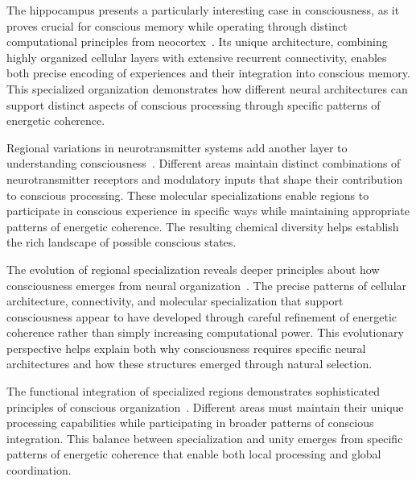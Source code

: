 The hippocampus presents a particularly interesting case in consciousness, as it proves crucial for conscious memory while operating through distinct computational principles from neocortex~\cite{Branco2010}. Its unique architecture, combining highly organized cellular layers with extensive recurrent connectivity, enables both precise encoding of experiences and their integration into conscious memory. This specialized organization demonstrates how different neural architectures can support distinct aspects of conscious processing through specific patterns of energetic coherence.

Regional variations in neurotransmitter systems add another layer to understanding consciousness~\cite{Tononi2016}. Different areas maintain distinct combinations of neurotransmitter receptors and modulatory inputs that shape their contribution to conscious processing. These molecular specializations enable regions to participate in conscious experience in specific ways while maintaining appropriate patterns of energetic coherence. The resulting chemical diversity helps establish the rich landscape of possible conscious states.

The evolution of regional specialization reveals deeper principles about how consciousness emerges from neural organization~\cite{lyon2021reframing}. The precise patterns of cellular architecture, connectivity, and molecular specialization that support consciousness appear to have developed through careful refinement of energetic coherence rather than simply increasing computational power. This evolutionary perspective helps explain both why consciousness requires specific neural architectures and how these structures emerged through natural selection.

The functional integration of specialized regions demonstrates sophisticated principles of conscious organization~\cite{bullmore2012economy}. Different areas must maintain their unique processing capabilities while participating in broader patterns of conscious integration. This balance between specialization and unity emerges from specific patterns of energetic coherence that enable both local processing and global coordination.

